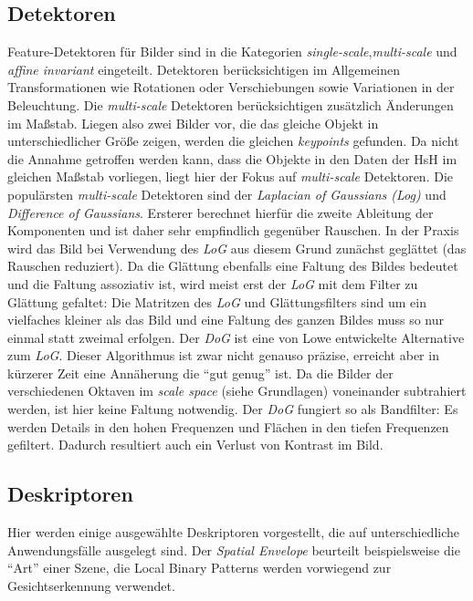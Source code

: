 \subsection{Detektoren}

Feature-Detektoren für Bilder sind in die Kategorien \textit{single-scale},\textit{multi-scale} und \textit{affine invariant} eingeteilt. Detektoren berücksichtigen im Allgemeinen Transformationen wie Rotationen oder Verschiebungen sowie Variationen in der Beleuchtung. Die \textit{multi-scale} Detektoren berücksichtigen zusätzlich Änderungen im Maßstab. Liegen also zwei Bilder vor, die das gleiche Objekt in unterschiedlicher Größe zeigen, werden die gleichen \textit{keypoints} gefunden. Da nicht die Annahme getroffen werden kann, dass die Objekte in den Daten der HsH im gleichen Maßstab vorliegen, liegt hier der Fokus auf \textit{multi-scale} Detektoren.\newline
Die populärsten \textit{multi-scale} Detektoren sind der \textit{Laplacian of Gaussians (Log)} und \textit{Difference of Gaussians}. Ersterer berechnet hierfür die zweite Ableitung der Komponenten und ist daher sehr empfindlich gegenüber Rauschen. In der Praxis wird das Bild bei Verwendung des \textit{LoG} aus diesem Grund zunächst geglättet (das Rauschen reduziert). Da die Glättung ebenfalls eine Faltung des Bildes bedeutet und die Faltung assoziativ ist, wird meist erst der \textit{LoG} mit dem Filter zu Glättung gefaltet: Die Matritzen des \textit{LoG} und Glättungsfilters sind um ein vielfaches kleiner als das Bild und eine Faltung des ganzen Bildes muss so nur einmal statt zweimal erfolgen. Der \textit{DoG} ist eine von Lowe entwickelte Alternative zum \textit{LoG}. Dieser Algorithmus ist zwar nicht genauso präzise, erreicht aber in kürzerer Zeit eine Annäherung die \enquote{gut genug} ist. Da die Bilder der verschiedenen Oktaven im \textit{scale space} (siehe Grundlagen) voneinander subtrahiert werden, ist hier keine Faltung notwendig. Der \textit{DoG} fungiert so als Bandfilter: Es werden Details in den hohen Frequenzen und Flächen in den tiefen Frequenzen gefiltert. Dadurch resultiert auch ein Verlust von Kontrast im Bild.

\subsection{Deskriptoren}

Hier werden einige ausgewählte Deskriptoren vorgestellt, die auf unterschiedliche Anwendungsfälle ausgelegt sind. Der \textit{Spatial Envelope} beurteilt beispielsweise die \enquote{Art} einer Szene, die Local Binary Patterns werden vorwiegend zur Gesichtserkennung verwendet. \newline

